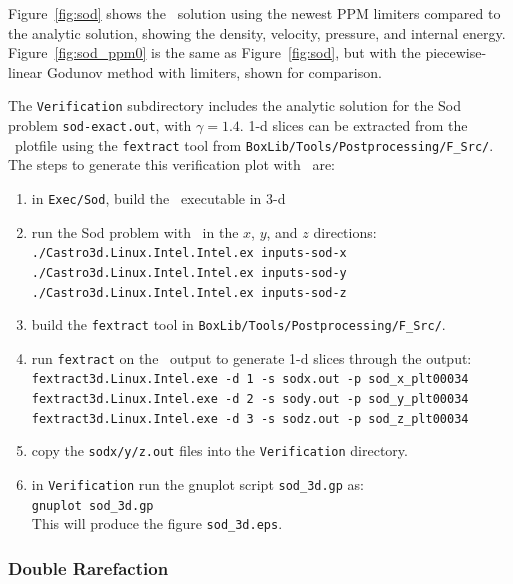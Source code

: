 Figure~\ref{fig:sod} shows the \castro\ solution using the newest PPM limiters
compared to the analytic 
solution, showing the density, velocity, pressure, and internal energy.
Figure~\ref{fig:sod_ppm0} is the same as Figure~\ref{fig:sod},
but with the piecewise-linear Godunov method with limiters, 
shown for comparison.

The {\tt Verification} subdirectory includes the analytic solution for
the Sod problem {\tt sod-exact.out}, with $\gamma = 1.4$.  1-d slices
can be extracted from the \castro\ plotfile using the {\tt fextract} tool
from {\tt BoxLib/Tools/Postprocessing/F\_Src/}.  
The steps to generate this verification plot with \castro\ are:
\begin{enumerate}
\item in {\tt Exec/Sod}, build the \castro\ executable in 3-d
\item run the Sod problem with \castro\ in the $x$, $y$, and $z$ directions: \\
 {\tt ./Castro3d.Linux.Intel.Intel.ex inputs-sod-x} \\
 {\tt ./Castro3d.Linux.Intel.Intel.ex inputs-sod-y} \\
 {\tt ./Castro3d.Linux.Intel.Intel.ex inputs-sod-z}
\item build the {\tt fextract} tool in {\tt BoxLib/Tools/Postprocessing/F\_Src/}.  
\item run {\tt fextract} on the \castro\ output to generate 1-d slices
 through the output: \\
 {\tt fextract3d.Linux.Intel.exe -d 1 -s sodx.out -p sod\_x\_plt00034} \\
 {\tt fextract3d.Linux.Intel.exe -d 2 -s sody.out -p sod\_y\_plt00034} \\
 {\tt fextract3d.Linux.Intel.exe -d 3 -s sodz.out -p sod\_z\_plt00034}
\item copy the {\tt sodx/y/z.out} files into the {\tt Verification} directory.
\item in {\tt Verification} run the gnuplot script {\tt sod\_3d.gp} as: \\
 {\tt gnuplot sod\_3d.gp} \\
 This will produce the figure {\tt sod\_3d.eps}.
\end{enumerate}

\subsubsection{Double Rarefaction}

